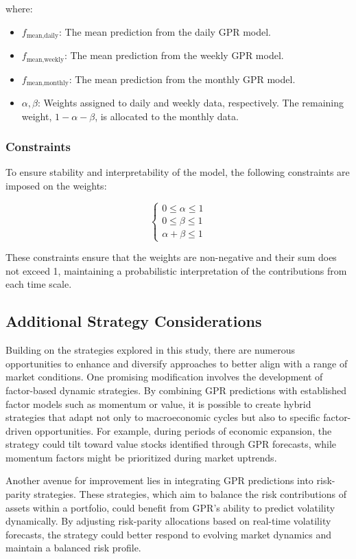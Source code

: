 where:
\begin{itemize}
    \item $f_{\text{mean,daily}}$: The mean prediction from the daily GPR model.
    \item $f_{\text{mean,weekly}}$: The mean prediction from the weekly GPR model.
    \item $f_{\text{mean,monthly}}$: The mean prediction from the monthly GPR model.
    \item $\alpha, \beta$: Weights assigned to daily and weekly data, respectively. The remaining weight, $1 - \alpha - \beta$, is allocated to the monthly data.
\end{itemize}

\subsubsection*{Constraints}
To ensure stability and interpretability of the model, the following constraints are imposed on the weights:

\[
\begin{cases}
0 \leq \alpha \leq 1 \\
0 \leq \beta \leq 1 \\
\alpha + \beta \leq 1
\end{cases}
\]

These constraints ensure that the weights are non-negative and their sum does not exceed 1, maintaining a probabilistic interpretation of the contributions from each time scale.

\subsection{Additional Strategy Considerations}
Building on the strategies explored in this study, there are numerous opportunities to enhance and diversify approaches to better align with a range of market conditions. One promising modification involves the development of factor-based dynamic strategies. By combining GPR predictions with established factor models such as momentum or value, it is possible to create hybrid strategies that adapt not only to macroeconomic cycles but also to specific factor-driven opportunities. For example, during periods of economic expansion, the strategy could tilt toward value stocks identified through GPR forecasts, while momentum factors might be prioritized during market uptrends.

Another avenue for improvement lies in integrating GPR predictions into risk-parity strategies. These strategies, which aim to balance the risk contributions of assets within a portfolio, could benefit from GPR's ability to predict volatility dynamically. By adjusting risk-parity allocations based on real-time volatility forecasts, the strategy could better respond to evolving market dynamics and maintain a balanced risk profile.

